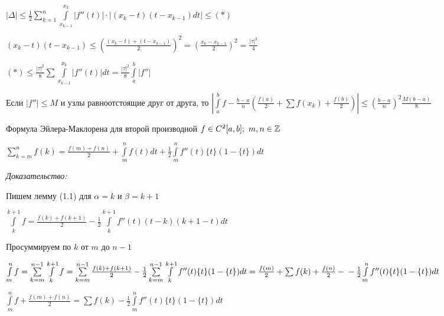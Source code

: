 \documentclass[12pt]{article}
\begin{document}
$|\Delta| \leq \frac{1}{2} \sum\limits_{k = 1}^n \int\limits_{x_{k - 1}}^{x_k} |f''(t)| \cdot |(x_k - t)(t - x_{k - 1})dt| \leq (*)$

$(x_k - t)(t - x_{k - 1}) \leq (\frac{(x_k - t) + (t - x_{k - 1})}{2})^2 = (\frac{x_k - x_{k - 1}}{2})^2 = \frac{|\tau|^2}{4}$

$(*) \leq \frac{|\tau|^2}{8} \sum \int\limits_{x_{k - 1}}^{x_k} |f''(t)|dt = \frac{|\tau|^2}{8} \int\limits_a^b |f''|$

\begin{Remark}{}
    Если $|f''| \leq M$ и узлы равноотстоящие друг от друга, то $|\int\limits_a^b f - \frac{b - a}{n} (\frac{f(a)}{2} + \sum f(x_k) + \frac{f(b)}{2})| \leq (\frac{b - a}{n})^2 \frac{M(b - a)}{8}$
\end{Remark}

\begin{theo}{Формула Эйлера-Маклорена для второй производной}
    $f \in C^2[a, b];\ m, n \in \mathbb Z$

    $\sum\limits_{k = m}^n f(k) = \frac{f(m) + f(n)}{2} + \int\limits_m^n f(t)dt + \frac{1}{2}\int\limits_m^n f''(t)\{t\}(1 - \{t\})dt$
\end{theo}

\textit{Доказательство:}

Пишем лемму (1.1) для $\alpha = k$ и $\beta = k + 1$

$\int\limits_k^{k + 1} f = \frac{f(k) + f(k + 1)}{2} - \frac{1}{2} \int\limits_k^{k + 1} f''(t)(t - k)(k + 1 - t)dt$

Просуммируем по $k$ от $m$ до $n - 1$

$\int\limits_m^n f = \sum\limits_{k = m}^{n - 1} \int\limits_{k}^{k + 1} f = \sum\limits_{k = m}^{n - 1} \frac{f(k) + f(k + 1)}{2} - \frac{1}{2} \sum\limits_{k = m}^{n - 1} \int\limits_k^{k + 1} f''(t)\{t\}(1 - \{t\})dt = \frac{f(m)}{2} + \sum f(k) + \frac{f(n)}{2} - \\
- \frac{1}{2} \int\limits_m^n f''(t)\{t\}(1 - \{t\})dt$

$\int\limits_m^n f + \frac{f(m) + f(n)}{2} = \sum f(k) - \frac{1}{2} \int\limits_m^n f''(t) \{t\}(1 - \{t\})dt$
\end{document}

